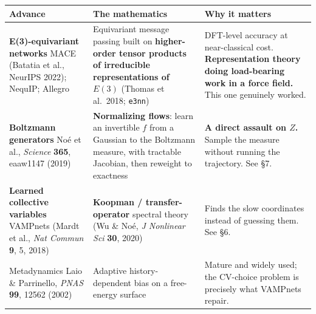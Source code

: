 \begin{center}\small
\begin{tabular}{@{}>{\raggedright\arraybackslash}p{4.2cm}>{\raggedright\arraybackslash}p{6.3cm}>{\raggedright\arraybackslash}p{5.8cm}@{}}
\toprule
\rowcolor{bio!13}
\textbf{\color{bio}Advance} & \textbf{\color{bio}The mathematics} & \textbf{\color{bio}Why it matters}\\
\midrule
\textbf{E(3)-equivariant networks} \newline MACE (Batatia et al., NeurIPS 2022); NequIP; Allegro &
 Equivariant message passing built on \textbf{higher-order tensor products of irreducible
 representations of $E(3)$} (Thomas et al.\ 2018; \texttt{e3nn}) &
 DFT-level accuracy at near-classical cost. \textbf{Representation theory doing load-bearing work in
 a force field.} This one genuinely worked.\\
\textbf{Boltzmann generators} \newline Noé et al., \textit{Science} \textbf{365}, eaaw1147 (2019) &
 \textbf{Normalizing flows}: learn an invertible $f$ from a Gaussian to the Boltzmann measure, with
 tractable Jacobian, then reweight to exactness &
 \textbf{A direct assault on $Z$.} Sample the measure without running the trajectory. See §7.\\
\textbf{Learned collective variables} \newline VAMPnets (Mardt et al., \textit{Nat Commun} \textbf{9}, 5, 2018) &
 \textbf{Koopman / transfer-operator} spectral theory (Wu \& Noé, \textit{J Nonlinear Sci}
 \textbf{30}, 2020) &
 Finds the slow coordinates instead of guessing them. See §6.\\
Metadynamics \newline Laio \& Parrinello, \textit{PNAS} \textbf{99}, 12562 (2002) &
 Adaptive history-dependent bias on a free-energy surface &
 Mature and widely used; the CV-choice problem is precisely what VAMPnets repair.\\
\bottomrule
\end{tabular}
\end{center}
